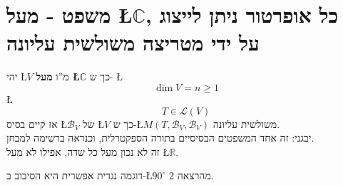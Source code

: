 \documentclass[english,hebrew]{article}
\begin{document}
\section{משפט - מעל \L{$\mathbb{C}$}, כל אופרטור ניתן לייצוג על ידי מטריצה
משולשית עליונה}

יהי \L{$V$} מ\textquotedblright ו \textbf{מעל \L{$\mathbb{C}$}}
כך ש- \L{%
\[
\dim V=n\geq1
\]
}%
\L{%
\[
T\in\mathcal{L}(V)
\]
}%
אז קיים בסיס \L{$\mathcal{B}_{V}$} של \L{$V$} כך ש-\L{$M(T,\mathcal{B}_{V},\mathcal{B}_{V})$}
משולשית עליונה.\\

יבגני: זה אחד המשפטים הבסיסיים בתורה הספקטרלית, וכנראה ברשימה למבחן.\\

זה לא נכון מעל כל שדה, אפילו לא מעל \L{$\mathbb{R}$}. 

דוגמה נגדית אפשרית היא הסיבוב ב-\L{$90^{\circ}$} מהרצאה 2. 
\end{document}

